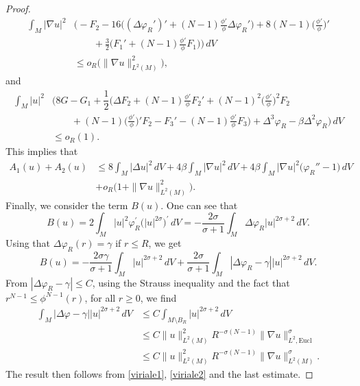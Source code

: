 \documentclass[10pt,leqno]{amsart}
\numberwithin{equation}{section}
\begin{document}
\begin{proof}
\begin{align*}
\int_M |\nabla u|^2 &\Big(-F_2 - 16  \big((\Delta \varphi_R')' +(N-1)\frac{\phi'}{\phi} \Delta \varphi_R' \big) +8(N-1)  \big(\frac{\phi'}{\phi}\big)' \\
&\qquad + \frac{3}{2} \big(F_1 ' + (N-1)\frac{\phi'}{\phi} F_1\big)  \Big)\,dV\\
&\leq o_R \big( \|\nabla u\|_{L^2 (M)}^2\big),
\end{align*}
and
\begin{align*}
\int_M |u|^2 &\Big(8G -G_1 +\dfrac{1}{2} \big(\Delta F_2 +(N-1)\frac{\phi'}{\phi} F_2 ' +(N-1)^2 \big(\frac{\phi'}{\phi}\big)^2 F_2\\
& \qquad + (N-1) \big(\frac{\phi'}{\phi}\big)' F_2- F_3 '- (N-1)\frac{\phi'}{\phi} F_3 \big)+\Delta^3 \varphi_R -\beta \Delta^2 \varphi_R\Big)\, dV\\
& \leq o_R (1).
\end{align*}
This implies that
\begin{align}
\label{viriale1}
A_1 (u) +A_2 (u) &\leq 8 \int_M |\Delta u|^2\, dV+4\beta \int_M |\nabla u|^2\, dV+4\beta \int_M |\nabla u|^2 \big(\varphi_R'' -1)\,dV\\
& +o_R \big( 1 + \|\nabla u\|_{L^2 (M)}^2\big).\nonumber
\end{align}
Finally, we consider the term $B(u)$. One can see that
$$B(u)= 2\int_{M} |u|^2 \varphi_R^\prime \big(|u|^{2\sigma}\big)^\prime\, dV =-\frac{2\sigma}{\sigma +1}\int_{M} \Delta \varphi_R |u|^{2\sigma +2}\, dV. $$
Using that $\Delta \varphi_R (r) = \gamma $ if $r\leq R$, we get
\begin{equation}
\label{viriale2}B(u)=-\frac{2\sigma \gamma}{\sigma +1}\int_M |u|^{2\sigma +2}\,dV +\frac{2\sigma}{\sigma +1}\int_{M} |\Delta \varphi_R -\gamma | |u|^{2\sigma +2}\, dV. 
\end{equation}
From $|\Delta \varphi_R -\gamma |\leq C $, using the Strauss inequality and the fact that $r^{N-1}\leq \phi^{N-1}(r)$, for all $r\geq 0$, we find 
 \begin{align*}
\int_{M} |\Delta \varphi -\gamma | |u|^{2\sigma +2}\, dV& \leq C\int_{M\setminus B_R} |u|^{2\sigma +2}\,dV \\
&\leq C \|u\|_{L^2 (M)}^2 R^{-\sigma (N-1)} \|\nabla u\|_{L^2,\text{Eucl}}^{\sigma}\\
& \leq C\|u\|_{L^2 (M)}^2 R^{-\sigma (N-1)} \|\nabla u\|_{L^2 (M)}^{\sigma}. 
\end{align*} 
The result then follows from \eqref{viriale1}, \eqref{viriale2} and the last estimate.
\end{proof}
\end{document}
